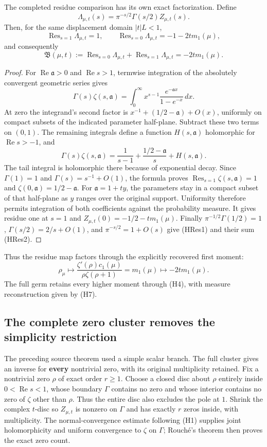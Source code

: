 The completed residue comparison has its own exact factorization. Define
\[
 \Lambda_{\mu,t}(s)=\pi^{-s/2}\Gamma(s/2)Z_{\mu,t}(s).
\]
Then, for the same displacement domain \(|t|L<1\),
\[
 \operatorname{Res}_{s=1}\Lambda_{\mu,t}=1,\qquad
 \operatorname{Res}_{s=0}\Lambda_{\mu,t}=-1-2t m_1(\mu),
 \tag{HRes1}
\]
and consequently
\[
 \mathfrak B(\mu,t):=
 \operatorname{Res}_{s=0}\Lambda_{\mu,t}
 +\operatorname{Res}_{s=1}\Lambda_{\mu,t}
 =-2t m_1(\mu).
 \tag{HRes2}
\]
\begin{proof}
For \(\operatorname{Re}\mathfrak a>0\) and \(\operatorname{Re}s>1\),
termwise integration of the absolutely convergent geometric series gives
\[
 \Gamma(s)\zeta(s,\mathfrak a)
 =\int_0^\infty x^{s-1}
       \frac{e^{-\mathfrak a x}}{1-e^{-x}}\,dx.
\]
At zero the integrand's second factor is
\(x^{-1}+(1/2-\mathfrak a)+O(x)\), uniformly on compact
subsets of the indicated parameter half-plane. Subtract these two
terms on \((0,1)\). The remaining integrals define a function
\(H(s,\mathfrak a)\) holomorphic for \(\operatorname{Re}s>-1\), and
\[
 \Gamma(s)\zeta(s,\mathfrak a)
 =\frac1{s-1}+\frac{1/2-\mathfrak a}{s}
      +H(s,\mathfrak a).
\]
The tail integral is holomorphic there because of exponential decay.
Since \(\Gamma(1)=1\) and \(\Gamma(s)=s^{-1}+O(1)\), the formula
proves \(\operatorname{Res}_{s=1}\zeta(s,\mathfrak a)=1\) and
\(\zeta(0,\mathfrak a)=1/2-\mathfrak a\).
For \(\mathfrak a=1+ty\), the parameters stay in a compact subset
of that half-plane as \(y\) ranges over the original support.
Uniformity therefore permits integration of both coefficients against
the probability measure. It gives residue one at \(s=1\) and
\(Z_{\mu,t}(0)=-1/2-tm_1(\mu)\).
Finally \(\pi^{-1/2}\Gamma(1/2)=1\),
\(\Gamma(s/2)=2/s+O(1)\), and \(\pi^{-s/2}=1+O(s)\)
give (HRes1) and their sum (HRes2).
\end{proof}
Thus the residue map factors through the explicitly recovered first
moment:
\[
 \rho_\mu\longmapsto
 \frac{\zeta'(\rho)c_1(\mu)}{\rho\zeta(\rho+1)}
 =m_1(\mu)\longmapsto -2t m_1(\mu).
\]
The full germ retains every higher moment through (H4), with measure
reconstruction given by (H7).

\subsection{The complete zero cluster removes the simplicity restriction}\label{the-complete-zero-cluster-removes-the-simplicity-restriction}

The preceding source theorem used a simple scalar branch. The full cluster gives an inverse for \textbf{every} nontrivial zero, with its original multiplicity retained. Fix a nontrivial zero \(\rho\) of exact order \(r\ge 1\). Choose a closed disc about \(\rho\) entirely inside \(0<\operatorname{Re} s<1\), whose boundary \(\Gamma\) contains no zero and whose interior contains no zero of \(\zeta\) other than \(\rho\). Thus the entire disc also excludes the pole at \(1\). Shrink the complex \(t\)-disc so \(Z_{\mu ,t}\) is nonzero on \(\Gamma\) and has exactly \(r\) zeros inside, with multiplicity. The normal-convergence estimate following (H1) supplies joint holomorphicity and uniform convergence to \(\zeta\) on \(\Gamma\); Rouché's theorem then proves the exact zero count.

